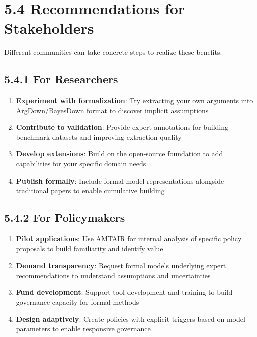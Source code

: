 \documentclass[
  11pt,
  letterpaper,
]{book}
\providecommand{\tightlist}{%
  \setlength{\itemsep}{0pt}\setlength{\parskip}{0pt}}
\begin{document}
\section{5.4 Recommendations for
Stakeholders}\label{sec-recommendations}

Different communities can take concrete steps to realize these benefits:

\subsection{5.4.1 For Researchers}\label{sec-researcher-recommendations}

\begin{enumerate}
\def\labelenumi{\arabic{enumi}.}
\tightlist
\item
  \textbf{Experiment with formalization}: Try extracting your own
  arguments into ArgDown/BayesDown format to discover implicit
  assumptions
\item
  \textbf{Contribute to validation}: Provide expert annotations for
  building benchmark datasets and improving extraction quality
\item
  \textbf{Develop extensions}: Build on the open-source foundation to
  add capabilities for your specific domain needs
\item
  \textbf{Publish formally}: Include formal model representations
  alongside traditional papers to enable cumulative building
\end{enumerate}

\subsection{5.4.2 For
Policymakers}\label{sec-policymaker-recommendations}

\begin{enumerate}
\def\labelenumi{\arabic{enumi}.}
\tightlist
\item
  \textbf{Pilot applications}: Use AMTAIR for internal analysis of
  specific policy proposals to build familiarity and identify value
\item
  \textbf{Demand transparency}: Request formal models underlying expert
  recommendations to understand assumptions and uncertainties
\item
  \textbf{Fund development}: Support tool development and training to
  build governance capacity for formal methods
\item
  \textbf{Design adaptively}: Create policies with explicit triggers
  based on model parameters to enable responsive governance
\end{enumerate}
\end{document}
